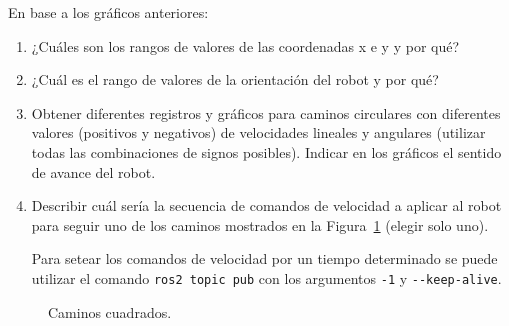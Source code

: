 \documentclass[tp]{lcc}
\begin{document}
En base a los gráficos anteriores:

\begin{enumerate}

\item ¿Cuáles son los rangos de valores de las coordenadas x e y y por qué?

\item  ¿Cuál es el rango de valores de la orientación del robot y por qué?

\item Obtener diferentes registros y gráficos para caminos circulares con diferentes valores (positivos y negativos) de velocidades lineales y angulares (utilizar todas las combinaciones de signos posibles). Indicar en los gráficos el sentido de avance del robot.

\item Describir cuál sería la secuencia de comandos de velocidad a aplicar al robot para seguir uno de los caminos mostrados en la Figura~\ref{fig:trajectories} (elegir solo uno).

\begin{nota}
	Para setear los comandos de velocidad por un tiempo determinado se puede utilizar el comando \lstinline[style=bash]{ros2 topic pub} con los argumentos \lstinline[style=bash]{-1} y \lstinline[style=bash]{--keep-alive}.
\end{nota}

\end{enumerate}


\begin{figure}[!htbp]
    \centering
    \hspace{3cm}
    \caption{Caminos cuadrados.}
    \label{fig:trajectories}
\end{figure}
\end{document}

